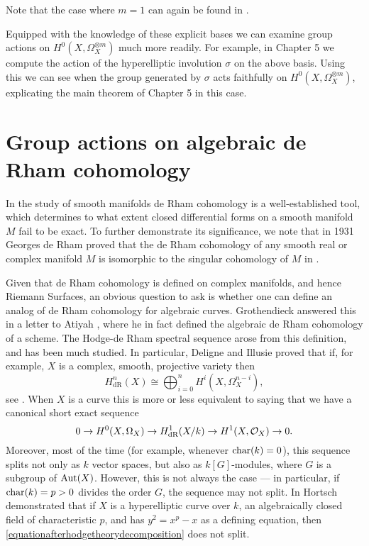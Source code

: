 Note that the case where $m=1$ can again be found in \cite[Prop. 7.4.26]{liu}.

Equipped with the knowledge of these explicit bases we can examine group actions on $H^0(X,\Omega_X^{\otimes m})$ much more readily.
For example, in Chapter 5 we compute the action of the hyperelliptic involution $\sigma$ on the above basis.
Using this we can see when the group generated by $\sigma$ acts faithfully on $H^0(X,\Omega_X^{\otimes m})$, explicating the main theorem of Chapter 5 in this case.

\section{Group actions on algebraic de Rham cohomology}

In the study of smooth manifolds de Rham cohomology is a well-established tool, which determines to what extent closed differential forms on a smooth manifold $M$ fail to be exact.
To further demonstrate its significance, we note that in 1931 Georges de Rham proved that the de Rham cohomology of any smooth real or complex manifold $M$ is isomorphic to the singular cohomology of $M$ in \cite{derhamstheorem}.

Given that de Rham cohomology is defined on complex manifolds, and hence Riemann Surfaces, an obvious question to ask is whether one can define an analog of de Rham cohomology for algebraic curves.
Grothendieck answered this in a letter to Atiyah \cite{grothendiecklettertoatiyah}, where he in fact defined the algebraic de Rham cohomology of a scheme.
The Hodge-de Rham spectral sequence arose from this definition, and has been much studied.
In particular, Deligne and Illusie proved that if, for example, $X$ is a complex, smooth, projective variety then
    \begin{equation*}
    H^n_{\text{dR}}(X) \cong \bigoplus_{i=0}^n H^i(X,\Omega_X^{n-i}),
    \end{equation*}
see \cite{deligneillusie}.
When $X$ is a curve this is more or less equivalent to saying that we have a canonical short exact sequence
    \begin{equation}\label{equationafterhodgetheorydecomposition}
    0 \rightarrow {H^0(X,\Omega_X)} \rightarrow H_{\text {dR}}^1(X/k) \rightarrow H^1(X,\mathcal{O}_X) \rightarrow 0.
    \end{equation}
Moreover, most of the time (for example, whenever $\operatorname{char}(k) = 0$), this sequence splits not only as $k$ vector spaces, but also as $k[G]$-modules, where $G$ is a subgroup of $\operatorname{Aut}(X)$.
However, this is not always the case --- in particular, if $\operatorname{char}(k) = p >0$ divides the order $G$, the sequence may not split.
In \cite{canonicalrepresentation} Hortsch demonstrated that if $X$ is a hyperelliptic curve over $k$, an algebraically closed field of characteristic $p$, and has $y^2 = x^p-x$ as a defining equation, then \eqref{equationafterhodgetheorydecomposition} does not split.

